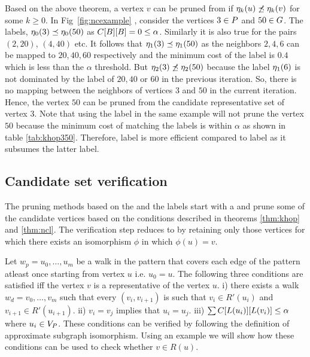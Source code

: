 Based on the above theorem, a vertex $v$ can be pruned from 
\CR if $\eta_{k}(u) \not\preceq \eta_{k}(v)$
for some $k \geq 0$. In Fig~\ref{fig:ncexample} , consider the vertices
$3 \in P$ and $50 \in G$. The \ncl labels, 
$\eta_{0}(3) \preceq \eta_{0}(50)$ as ${C}[B][B] = 0 \leq \alpha$.
Similarly it is also true for the pairs $(2, 20)$, $(4, 40)$ etc. It follows
that $\eta_{1}(3) \preceq \eta_{1}(50)$ as the neighbors $2, 4, 6$ can be mapped to
$20, 40, 60$ respectively and  the minimum cost of the \khop label 
is $0.4$ which is less than the $\alpha$ threshold. But
$\eta_{2}(3) \not\preceq \eta_{2}(50)$ because the \ncl label
$\eta_{1}(6)$ is not dominated by the \ncl label
of $20, 40$ or  $60$ in the previous iteration. So, 
there is no mapping between the neighbors of vertices $3$ and 
$50$ in the current iteration. Hence, the vertex $50$
can be pruned from the candidate representative set of vertex $3$.
Note that using the \khop label in the same example will not prune the
vertex $50$ because the minimum cost of matching the \khop labels is within
$\alpha$ as shown in table \ref{tab:khop350}. Therefore, \ncl label is more
efficient compared to \khop label as it subsumes the latter label.

\subsection{Candidate set verification}
\label{sec:verification}
The pruning methods based on the \khop and the \ncl labels start with a
\CR and prune some of the candidate vertices
based on the conditions described in theorems \ref{thm:khop} and \ref{thm:ncl}.
The verification step reduces \CR to \RS by retaining only those vertices
for which there exists an isomorphism $\phi$ in which $\phi(u) = v$.

Let $w_p = u_0,\ldots, u_m$ be a walk in the pattern that covers each
edge of the pattern atleast once starting from vertex $u$ i.e. $u_0 = u$.
The following three conditions are satisfied iff the vertex $v$ is a
representative of the vertex $u$. i) there exists a walk $w_d = v_0,\ldots, v_m$
such that every $(v_i, v_{i+1})$ is such that $v_i \in R'(u_i)$ and
$v_{i+1} \in R'(u_{i+1})$. ii) $v_i = v_j$ implies that $u_i = u_j$. iii) 
$\sum{C}[L(u_i)][L(v_i)] \leq \alpha$ where $u_i \in V_P$. These 
conditions can be verified by following the definition of approximate
subgraph isomorphism. Using an example we will show how these conditions
can be used to check whether $v \in R(u)$.

